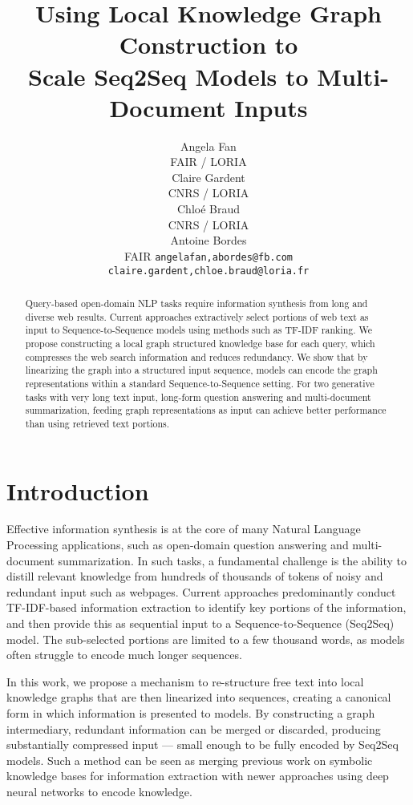 \documentclass[11pt,a4paper]{article}
\title{Using Local Knowledge Graph Construction to \\ 
Scale Seq2Seq Models to Multi-Document Inputs}
\author{Angela Fan \\
  FAIR / LORIA \\
  \And
  Claire Gardent \\
  CNRS / LORIA \\
  \And
  Chlo\'e Braud \\
  CNRS / LORIA \\
  \And
  Antoine Bordes \\
  FAIR 
  \AND 
  {\tt {angelafan,abordes}@fb.com} \\
  {\tt {claire.gardent,chloe.braud}@loria.fr}}
\date{}
\begin{document}
\maketitle 
\begin{abstract}
Query-based open-domain NLP tasks require information synthesis from long and diverse web results. Current approaches extractively select portions of web text as input to Sequence-to-Sequence models using methods such as TF-IDF ranking. We propose constructing a local graph structured knowledge base for each query, which compresses the web search information and reduces redundancy. We show that by linearizing the graph into a structured input sequence, models can encode the graph representations within a standard Sequence-to-Sequence setting. For two generative tasks with very long text input, long-form question answering and multi-document summarization, feeding graph representations as input can achieve better performance than using retrieved text portions.
\end{abstract}

\section{Introduction}

Effective information synthesis is at the core of many Natural Language Processing applications, such as open-domain question answering and multi-document summarization. In such tasks, a fundamental challenge is the ability to distill relevant knowledge from hundreds of thousands of tokens of noisy and redundant input such as webpages. Current approaches predominantly conduct TF-IDF-based information extraction to identify key portions of the information, and then provide this as sequential input to a Sequence-to-Sequence (Seq2Seq) model. The sub-selected portions are limited to a few thousand words, as models often struggle to encode much longer sequences.

In this work, we propose a mechanism to re-structure free text into local knowledge graphs that are then linearized into sequences, creating a canonical form in which information is presented to models. By constructing a graph intermediary, redundant information can be merged or discarded, producing substantially compressed input --- small enough to be fully encoded by Seq2Seq models. Such a method can be seen as merging previous work on symbolic knowledge bases for information extraction with newer approaches using deep neural networks to encode knowledge. 
\end{document}
